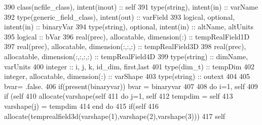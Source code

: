 \begin{DoxyCode}
390     \textcolor{keywordtype}{class}(ncfile\_class), \textcolor{keywordtype}{intent(inout)} :: self
391     \textcolor{keywordtype}{type}(string), \textcolor{keywordtype}{intent(in)} :: varName
392     \textcolor{keywordtype}{type}(generic\_field\_class), \textcolor{keywordtype}{intent(out)} :: varField
393     \textcolor{keywordtype}{logical}, \textcolor{keywordtype}{optional}, \textcolor{keywordtype}{intent(in)} :: binaryVar
394     \textcolor{keywordtype}{type}(string), \textcolor{keywordtype}{optional}, \textcolor{keywordtype}{intent(in)} :: altName, altUnits
395     \textcolor{keywordtype}{logical} :: bVar
396     \textcolor{keywordtype}{real(prec)}, \textcolor{keywordtype}{allocatable}, \textcolor{keywordtype}{dimension(:)} :: tempRealField1D
397     \textcolor{keywordtype}{real(prec)}, \textcolor{keywordtype}{allocatable}, \textcolor{keywordtype}{dimension(:,:,:)} :: tempRealField3D
398     \textcolor{keywordtype}{real(prec)}, \textcolor{keywordtype}{allocatable}, \textcolor{keywordtype}{dimension(:,:,:,:)} :: tempRealField4D
399     \textcolor{keywordtype}{type}(string) :: dimName, varUnits
400     \textcolor{keywordtype}{integer} :: i, j, k, id\_dim, first,last
401     \textcolor{keywordtype}{type}(dim\_t) :: tempDim
402     \textcolor{keywordtype}{integer}, \textcolor{keywordtype}{allocatable}, \textcolor{keywordtype}{dimension(:)} :: varShape
403     \textcolor{keywordtype}{type}(string) :: outext
404 
405     bvar= .false.
406     \textcolor{keywordflow}{if}(\textcolor{keyword}{present}(binaryvar)) bvar = binaryvar
407 
408     \textcolor{keywordflow}{do} i=1, self%
409         \textcolor{keywordflow}{if} (self%
410             \textcolor{keyword}{allocate}(varshape(self%
411             \textcolor{keywordflow}{do} j=1, self%
412                 tempdim = self%
413                 varshape(j) = tempdim%
414 \textcolor{keywordflow}{            end do}
415             \textcolor{keywordflow}{if}(self%
416                 \textcolor{keyword}{allocate}(temprealfield3d(varshape(1),varshape(2),varshape(3)))
417                 self%

\end{DoxyCode}
